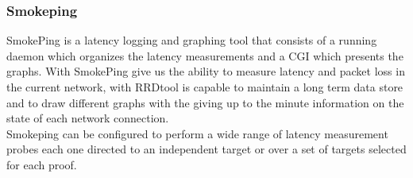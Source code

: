 \subsubsection{Smokeping}
SmokePing is a latency logging and graphing tool that consists of a running 
daemon which organizes the latency measurements and a CGI which presents the 
graphs. With SmokePing give us the ability to measure latency and packet loss 
in the current network, with RRDtool is capable to maintain a long term 
data store and to draw different graphs with the giving up to the minute 
information on the state of each network connection.\\

Smokeping can be configured to perform a wide range of latency measurement 
probes each one directed to an independent target or over a set of targets 
selected for each proof.\\


